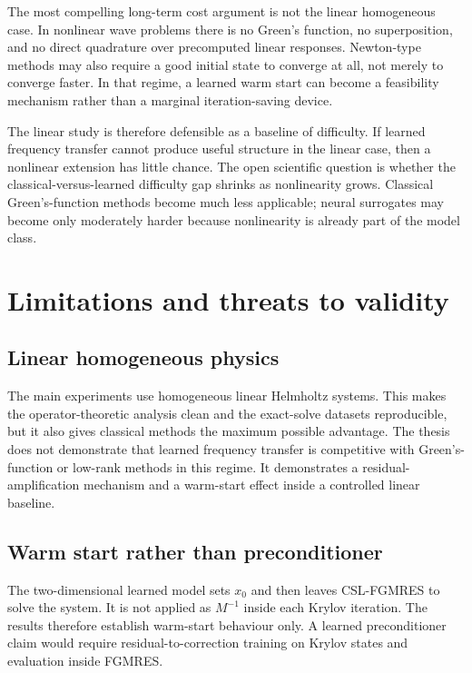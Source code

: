 The most compelling long-term cost argument is not the linear homogeneous
case. In nonlinear wave problems there is no Green's function, no
superposition, and no direct quadrature over precomputed linear responses.
Newton-type methods may also require a good initial state to converge at all,
not merely to converge faster. In that regime, a learned warm start can become
a feasibility mechanism rather than a marginal iteration-saving device.

The linear study is therefore defensible as a baseline of difficulty. If
learned frequency transfer cannot produce useful structure in the linear case,
then a nonlinear extension has little chance. The open scientific question is
whether the classical-versus-learned difficulty gap shrinks as nonlinearity
grows. Classical Green's-function methods become much less applicable; neural
surrogates may become only moderately harder because nonlinearity is already
part of the model class.

\section{Limitations and threats to validity}
\label{sec:discussion-limitations}

\subsection{Linear homogeneous physics}
\label{subsec:discussion-limit-linear}

The main experiments use homogeneous linear Helmholtz systems. This makes the
operator-theoretic analysis clean and the exact-solve datasets reproducible,
but it also gives classical methods the maximum possible advantage. The thesis
does not demonstrate that learned frequency transfer is competitive with
Green's-function or low-rank methods in this regime. It demonstrates a
residual-amplification mechanism and a warm-start effect inside a controlled
linear baseline.

\subsection{Warm start rather than preconditioner}
\label{subsec:discussion-limit-warmstart}

The two-dimensional learned model sets $x_0$ and then leaves CSL-FGMRES to
solve the system. It is not applied as $M^{-1}$ inside each Krylov iteration.
The results therefore establish warm-start behaviour only. A learned
preconditioner claim would require residual-to-correction training on Krylov
states and evaluation inside FGMRES.

